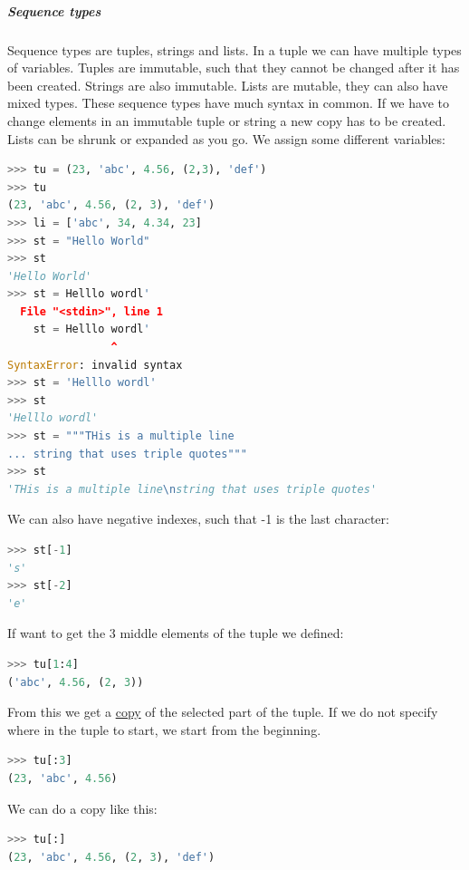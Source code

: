 \documentclass{article}
\begin{document}
\subparagraph{Sequence types}
Sequence types are tuples, strings and lists. In a tuple we can have multiple
types of variables. Tuples are immutable, such that they cannot be changed after
it has been created. Strings are also immutable. Lists are mutable, they can
also have mixed types.
These sequence types have much syntax in common. If we have to change elements
in an immutable tuple or string a new copy has to be created. Lists can be
shrunk or expanded as you go. We assign some different variables:

\begin{lstlisting}[inputencoding=utf8/latin1,basicstyle=\ttfamily,
language=python, keywordstyle=\color{blue}\bfseries, rulecolor=\color{black}]
>>> tu = (23, 'abc', 4.56, (2,3), 'def')
>>> tu
(23, 'abc', 4.56, (2, 3), 'def')
>>> li = ['abc', 34, 4.34, 23]
>>> st = "Hello World"
>>> st
'Hello World'
>>> st = Helllo wordl'
  File "<stdin>", line 1
    st = Helllo wordl'
                ^
SyntaxError: invalid syntax
>>> st = 'Helllo wordl'
>>> st
'Helllo wordl'
>>> st = """THis is a multiple line
... string that uses triple quotes"""
>>> st
'THis is a multiple line\nstring that uses triple quotes'
\end{lstlisting}
We can also have negative indexes, such that -1 is the last character:
\begin{lstlisting}[inputencoding=utf8/latin1,basicstyle=\ttfamily,
language=python, keywordstyle=\color{blue}\bfseries, rulecolor=\color{black}]
>>> st[-1]
's'
>>> st[-2]
'e'
\end{lstlisting}
If want to get the 3 middle elements of the tuple we defined:
\begin{lstlisting}[inputencoding=utf8/latin1,basicstyle=\ttfamily,
language=python, keywordstyle=\color{blue}\bfseries, rulecolor=\color{black}]
>>> tu[1:4]
('abc', 4.56, (2, 3))
\end{lstlisting}
From this we get a \underline{copy} of the selected part of the tuple. If we do
not specify where in the tuple to start, we start from the beginning.
\begin{lstlisting}[inputencoding=utf8/latin1,basicstyle=\ttfamily,
language=python, keywordstyle=\color{blue}\bfseries, rulecolor=\color{black}]
>>> tu[:3]
(23, 'abc', 4.56)
\end{lstlisting}
We can do a copy like this:
\begin{lstlisting}[inputencoding=utf8/latin1,basicstyle=\ttfamily,
language=python, keywordstyle=\color{blue}\bfseries, rulecolor=\color{black}]
>>> tu[:]
(23, 'abc', 4.56, (2, 3), 'def')
\end{lstlisting}
\end{document}
